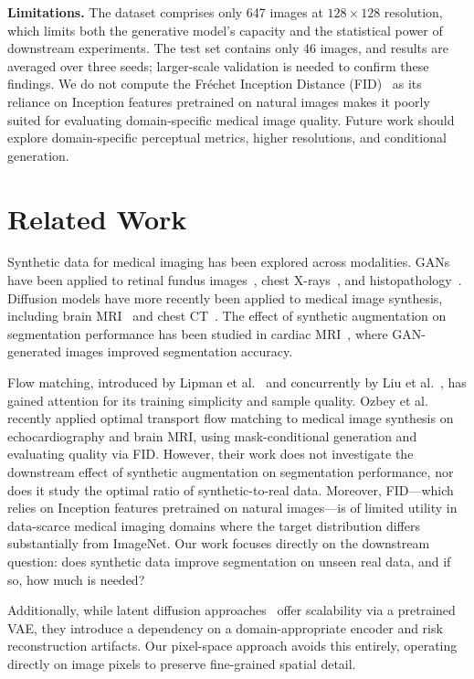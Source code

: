 \documentclass[twocolumn]{article}
\begin{document}
\textbf{Limitations.} The dataset comprises only 647 images at $128 \times 128$ resolution, which limits both the generative model's capacity and the statistical power of downstream experiments. The test set contains only 46 images, and results are averaged over three seeds; larger-scale validation is needed to confirm these findings. We do not compute the Fr\'{e}chet Inception Distance (FID)~\cite{heusel2017} as its reliance on Inception features pretrained on natural images makes it poorly suited for evaluating domain-specific medical image quality. Future work should explore domain-specific perceptual metrics, higher resolutions, and conditional generation.

\section{Related Work}
\label{sec:related}

Synthetic data for medical imaging has been explored across modalities. GANs have been applied to retinal fundus images~\cite{costa2018}, chest X-rays~\cite{jang2023}, and histopathology~\cite{hou2019}. Diffusion models have more recently been applied to medical image synthesis, including brain MRI~\cite{pinaya2022} and chest CT~\cite{khader2023}. The effect of synthetic augmentation on segmentation performance has been studied in cardiac MRI~\cite{zhang2022}, where GAN-generated images improved segmentation accuracy.

Flow matching, introduced by Lipman et al.~\cite{lipman2023} and concurrently by Liu et al.~\cite{liu2023}, has gained attention for its training simplicity and sample quality. Ozbey et al.~\cite{ozbey2025} recently applied optimal transport flow matching to medical image synthesis on echocardiography and brain MRI, using mask-conditional generation and evaluating quality via FID. However, their work does not investigate the downstream effect of synthetic augmentation on segmentation performance, nor does it study the optimal ratio of synthetic-to-real data. Moreover, FID---which relies on Inception features pretrained on natural images---is of limited utility in data-scarce medical imaging domains where the target distribution differs substantially from ImageNet. Our work focuses directly on the downstream question: does synthetic data improve segmentation on unseen real data, and if so, how much is needed?

Additionally, while latent diffusion approaches~\cite{pinaya2022} offer scalability via a pretrained VAE, they introduce a dependency on a domain-appropriate encoder and risk reconstruction artifacts. Our pixel-space approach avoids this entirely, operating directly on image pixels to preserve fine-grained spatial detail.
\end{document}
